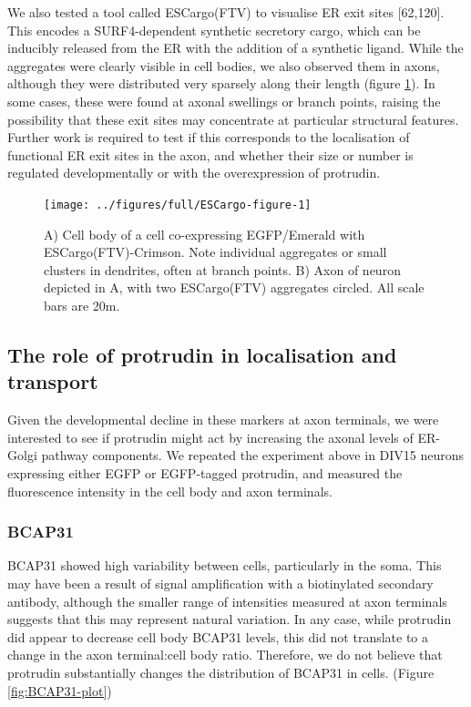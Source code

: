 \documentclass[
  12pt,
  a4paper,
]{book}
\begin{document}
We also tested a tool called ESCargo(FTV) to visualise ER exit sites {[}62,120{]}. This encodes a SURF4-dependent synthetic secretory cargo, which can be inducibly released from the ER with the addition of a synthetic ligand. While the aggregates were clearly visible in cell bodies, we also observed them in axons, although they were distributed very sparsely along their length (figure \ref{fig:ESCargo-figure}). In some cases, these were found at axonal swellings or branch points, raising the possibility that these exit sites may concentrate at particular structural features. Further work is required to test if this corresponds to the localisation of functional ER exit sites in the axon, and whether their size or number is regulated developmentally or with the overexpression of protrudin.

\begin{figure}
\texttt{[image: ../figures/full/ESCargo-figure-1]} \caption[ESCargo localisation in cortical neurons]{A) Cell body of a cell co-expressing EGFP/Emerald with ESCargo(FTV)-Crimson.  Note individual aggregates or small clusters in dendrites, often at branch points.  B) Axon of neuron depicted in A, with two ESCargo(FTV) aggregates circled.  All scale bars are 20\textmu{}m.}\label{fig:ESCargo-figure}
\end{figure}

\hypertarget{the-role-of-protrudin-in-localisation-and-transport}{%
\subsection{The role of protrudin in localisation and transport}\label{the-role-of-protrudin-in-localisation-and-transport}}

Given the developmental decline in these markers at axon terminals, we were interested to see if protrudin might act by increasing the axonal levels of ER-Golgi pathway components. We repeated the experiment above in DIV15 neurons expressing either EGFP or EGFP-tagged protrudin, and measured the fluorescence intensity in the cell body and axon terminals.

\hypertarget{bcap31}{%
\subsubsection{BCAP31}\label{bcap31}}

BCAP31 showed high variability between cells, particularly in the soma. This may have been a result of signal amplification with a biotinylated secondary antibody, although the smaller range of intensities measured at axon terminals suggests that this may represent natural variation. In any case, while protrudin did appear to decrease cell body BCAP31 levels, this did not translate to a change in the axon terminal:cell body ratio. Therefore, we do not believe that protrudin substantially changes the distribution of BCAP31 in cells. (Figure \ref{fig:BCAP31-plot})
\end{document}
